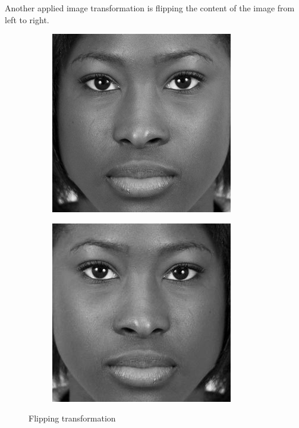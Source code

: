 Another applied image transformation is flipping the content of the image from left to right.

\begin{figure}[H]
\centering
\begin{subfigure}[b]{.3\linewidth}
\includegraphics[width=\linewidth]{img/tests/shifts/image.jpg}
\end{subfigure}
\centering
\begin{subfigure}[b]{.3\linewidth}
\includegraphics[width=\linewidth]{img/tests/shifts/flipped_image.jpg}
\end{subfigure}
\caption{Flipping transformation}
\end{figure}


